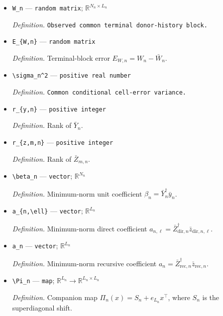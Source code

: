 \documentclass{article}
\begin{document}
\begin{itemize}
  \item \texttt{W\_\allowbreak{}n} --- \texttt{random matrix}; \(\mathbb R^{N_n\times L_n}\)
  \par\smallskip\noindent\emph{Definition.} \texttt{Observed common terminal donor-\allowbreak{}history block.}
  \item \texttt{E\_\allowbreak{}\{W,\allowbreak{}n\}\allowbreak{}} --- \texttt{random matrix}
  \par\smallskip\noindent\emph{Definition.} Terminal-block error \(E_{W,n}=W_n-\bar W_n\).
  \item \texttt{\textbackslash{}\allowbreak{}sigma\_\allowbreak{}n\textasciicircum{}2} --- \texttt{positive real number}
  \par\smallskip\noindent\emph{Definition.} \texttt{Common conditional cell-\allowbreak{}error variance.}
  \item \texttt{r\_\allowbreak{}\{y,\allowbreak{}n\}\allowbreak{}} --- \texttt{positive integer}
  \par\smallskip\noindent\emph{Definition.} Rank of \(\bar Y_n\).
  \item \texttt{r\_\allowbreak{}\{z,\allowbreak{}m,\allowbreak{}n\}\allowbreak{}} --- \texttt{positive integer}
  \par\smallskip\noindent\emph{Definition.} Rank of \(\bar Z_{m,n}\).
  \item \texttt{\textbackslash{}\allowbreak{}beta\_\allowbreak{}n} --- \texttt{vector}; \(\mathbb R^{N_n}\)
  \par\smallskip\noindent\emph{Definition.} Minimum-norm unit coefficient \(\beta_n=\bar Y_n^{\dagger}\bar y_n\).
  \item \texttt{a\_\allowbreak{}\{n,\allowbreak{}\textbackslash{}\allowbreak{}ell\}\allowbreak{}} --- \texttt{vector}; \(\mathbb R^{L_n}\)
  \par\smallskip\noindent\emph{Definition.} Minimum-norm direct coefficient \(a_{n,\ell}=\bar Z_{\mathrm{dir},n}^{\dagger}\bar z_{\mathrm{dir},n,\ell}\).
  \item \texttt{a\_\allowbreak{}n} --- \texttt{vector}; \(\mathbb R^{L_n}\)
  \par\smallskip\noindent\emph{Definition.} Minimum-norm recursive coefficient \(a_n=\bar Z_{\mathrm{rec},n}^{\dagger}\bar z_{\mathrm{rec},n}\).
  \item \texttt{\textbackslash{}\allowbreak{}Pi\_\allowbreak{}n} --- \texttt{map}; \(\mathbb R^{L_n}\to\mathbb R^{L_n\times L_n}\)
  \par\smallskip\noindent\emph{Definition.} Companion map \(\Pi_n(x)=S_n+e_{L_n}x^{\top}\), where \(S_n\) is the superdiagonal shift.

\end{itemize}
\end{document}
